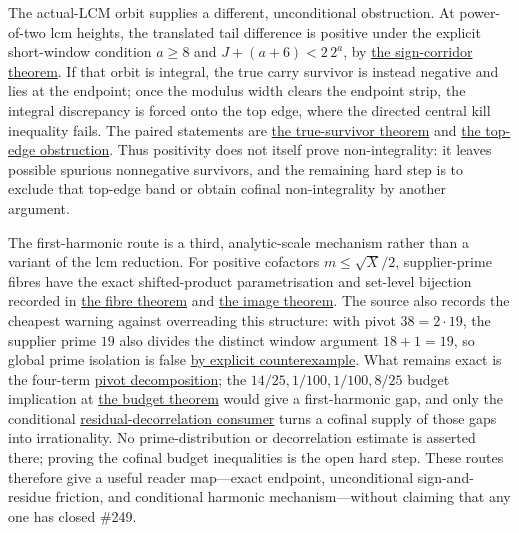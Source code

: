 \documentclass[11pt]{article}
\newcommand{\commit}{99f4bf47422abbd8757cbb22b50ba079d764d3a7}
\newcommand{\repobase}{https://github.com/wcook04/plectis-erdos/blob/\commit}
\newcommand{\PK}{Erdos249257}
\newcommand{\lword}[4]{\href{\repobase/\PK/#1\#L#2}{#4}}
\theoremstyle{definition}
\theoremstyle{remark}
\begin{document}
The actual-LCM orbit supplies a different, unconditional obstruction.  At
power-of-two lcm heights, the translated tail difference is positive under
the explicit short-window condition
\(a\ge8\) and \(J+(a+6)<2\,2^a\), by
\lword{TotientActualLcmOrbitSign.lean}{39}{actualLcmTailDiff_shift_pos}{the sign-corridor theorem}.
If that orbit is integral, the true carry survivor is instead negative and
lies at the endpoint; once the modulus width clears the endpoint strip, the
integral discrepancy is forced onto the top edge, where the directed central
kill inequality fails.  The paired statements are
\lword{TotientActualLcmOrbitSign.lean}{172}{actualLcm_trueEndpointSurvivor_neg}{the true-survivor theorem}
and
\lword{TotientActualLcmOrbitSign.lean}{211}{actualLcm_integral_forces_topEdgeResidue}{the top-edge obstruction}.
Thus positivity does not itself prove non-integrality: it leaves possible
spurious nonnegative survivors, and the remaining hard step is to exclude
that top-edge band or obtain cofinal non-integrality by another argument.

The first-harmonic route is a third, analytic-scale mechanism rather than a
variant of the lcm reduction.  For positive cofactors
\(m\le\sqrt X/2\), supplier-prime fibres have the exact shifted-product
parametrisation and set-level bijection recorded in
\lword{FirstHarmonicPivot.lean}{299}{mem_pivotFiber_iff_exists_supplierPrime}{the fibre theorem}
and
\lword{FirstHarmonicPivot.lean}{384}{image_pivotSupplierPrimes_eq_pivotFiber}{the image theorem}.
The source also records the cheapest warning against overreading this
structure: with pivot \(38=2\cdot19\), the supplier prime \(19\) also divides
the distinct window argument \(18+1=19\), so global prime isolation is false
\lword{FirstHarmonicPivot.lean}{394}{supplierPrime_not_globally_isolated_counterexample}{by explicit counterexample}.
What remains exact is the four-term
\lword{FirstHarmonicPivot.lean}{514}{windowFirstExp_sum_eq_pivot_decomposition}{pivot decomposition};
the \(14/25,1/100,1/100,8/25\) budget implication at
\lword{FirstHarmonicPivot.lean}{549}{first_harmonic_gap_of_pivotBudgetAt}{the budget theorem}
would give a first-harmonic gap, and only the conditional
\lword{FirstHarmonicPivot.lean}{577}{irrational_totient_series_of_pivotResidualDecorrelation}{residual-decorrelation consumer}
turns a cofinal supply of those gaps into irrationality.  No
prime-distribution or decorrelation estimate is asserted there; proving the
cofinal budget inequalities is the open hard step.  These routes therefore
give a useful reader map---exact endpoint, unconditional sign-and-residue
friction, and conditional harmonic mechanism---without claiming that any one
has closed \#249.
\end{document}
